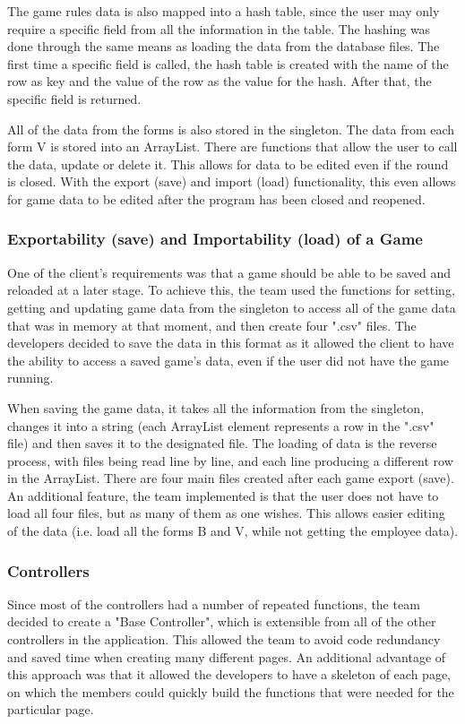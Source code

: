 \documentclass{l3proj}
\begin{document}
The game rules data is also mapped into a hash table, since the user may only require a specific field from all the information in the table. The hashing was done through the same means as loading the data from the database files. The first time a specific field is called, the hash table is created with the name of the row as key and the value of the row as the value for the hash. After that, the specific field is returned.

All of the data from the forms is also stored in the singleton. The data from each form V is stored into an ArrayList. There are functions that allow the user to call the data, update or delete it. This allows for data to be edited even if the round is closed. With the export (save) and import (load) functionality, this even allows for game data to be edited after the program has been closed and reopened.

\subsubsection{Exportability (save) and Importability (load) of a Game}
One of the client's requirements was that a game should be able to be saved and reloaded at a later stage. To achieve this, the team used the functions for setting, getting and updating game data from the singleton to access all of the game data that was in memory at that moment, and then create four ".csv" files. The developers decided to save the data in this format as it allowed the client to have the ability to access a saved game's data, even if the user did not have the game running.

When saving the game data, it takes all the information from the singleton, changes it into a string (each ArrayList element represents a row in the ".csv" file) and then saves it to the designated file. The loading of data is the reverse process, with files being read line by line, and each line producing a different row in the ArrayList. There are four main files created after each game export (save). An additional feature, the team implemented is that the user does not have to load all four files, but as many of them as one wishes. This allows easier editing of the data (i.e. load all the forms B and V, while not getting the employee data).

\subsubsection{Controllers}
Since most of the controllers had a number of repeated functions, the team decided to create a "Base Controller", which is extensible from all of the other controllers in the application. This allowed the team to avoid code redundancy and saved time when creating many different pages. An additional advantage of this approach was that it allowed the developers to have a skeleton of each page, on which the members could quickly build the functions that were needed for the particular page.
\end{document}
